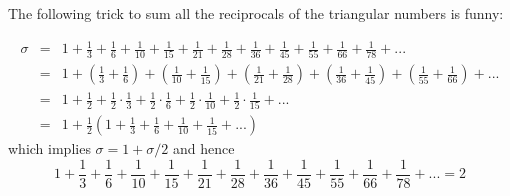 \documentclass[12pt]{article}
\begin{document}
The following trick to sum all the reciprocals of the triangular numbers is funny:

\begin{eqnarray*}
\sigma&=&1 + \frac{1}{3} + \frac{1}{6} + \frac{1}{10} + \frac{1}{15} + \frac{1}{21} + 
  \frac{1}{28} + \frac{1}{36} + \frac{1}{45} + \frac{1}{55} + \frac{1}{66} + 
  \frac{1}{78} +...\\
      &=&1 + \left(\frac{1}{3} + \frac{1}{6}\right)+\left( \frac{1}{10} + \frac{1}{15}\right) + 
\left(\frac{1}{21} + \frac{1}{28}\right) + \left(\frac{1}{36} + \frac{1}{45}\right) +\left( \frac{1}{55} + 
\frac{1}{66}\right) +...\\
&=&1 + \frac{1}{2} + \frac{1}{2}\cdot\frac{1}{3} + \frac{1}{2}\cdot\frac{1}{6} + \frac{1}{2}\cdot\frac{1}{10} 
+ \frac{1}{2}\cdot\frac{1}{15} +... \\
&=&1 + \frac{1}{2}\left( 1 + \frac{1}{3} + \frac{1}{6} + \frac{1}{10} + \frac{1}{15} +...\right)
\end{eqnarray*}
which implies $\sigma=1+\sigma/2$ and hence 
$$1 + \frac{1}{3} + \frac{1}{6} + \frac{1}{10} + \frac{1}{15} + \frac{1}{21} + 
  \frac{1}{28} + \frac{1}{36} + \frac{1}{45} + \frac{1}{55} + \frac{1}{66} + 
  \frac{1}{78} +...=2$$



\end{document}
